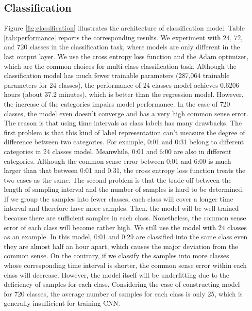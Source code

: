 \documentclass{article}
\begin{document}
\subsection{Classification}
Figure \ref{fig:classification} illustrates the architecture of classification model. Table \ref{tab:performance} reports the corresponding results. We experiment with 24, 72, and 720 classes in the classification task, where models are only different in the last output layer. We use the cross entropy loss function and the Adam optimizer, which are the common choices for multi-class classification task. Although the classification model has much fewer trainable parameters (287,064 trainable parameters for 24 classes), the performance of 24 classes model achieves 0.6206 hours (about 37.2 minutes), which is better than the regression model. However, the increase of the categories impairs model performance. In the case of 720 classes, the model even doesn't converge and has a very high common sense error. The reason is that using time intervals as class labels has many drawbacks. The first problem is that this kind of label representation can't measure the degree of difference between two categories. For example, 0:01 and 0:31 belong to different categories in 24 classes model. Meanwhile, 0:01 and 6:00 are also in different categories. Although the common sense error between 0:01 and 6:00 is much larger than that between 0:01 and 0:31, the cross entropy loss function treats the two cases as the same. The second problem is that the trade-off between the length of sampling interval and the number of samples is hard to be determined. If we group the samples into fewer classes, each class will cover a longer time interval and therefore have more samples. Then, the model will be well trained because there are sufficient samples in each class. Nonetheless, the common sense error of each class will become rather high. We still use the model with 24 classes as an example. In this model, 0:01 and 0:29 are classified into the same class even they are almost half an hour apart, which causes the major deviation from the common sense. On the contrary, if we classify the samples into more classes whose corresponding time interval is shorter, the common sense error within each class will decrease. However, the model itself will be underfitting due to the deficiency of samples for each class. Considering the case of constructing model for 720 classes, the average number of samples for each class is only 25, which is generally insufficient for training CNN.
\end{document}
